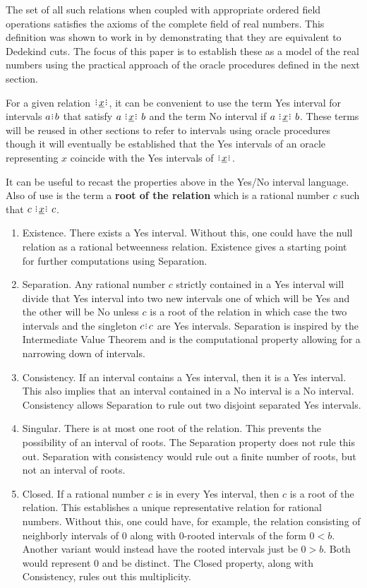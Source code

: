 \documentclass[12pt]{article}
\begin{document}
The set of all such relations when coupled with appropriate ordered field operations satisfies the axioms of the complete field of real numbers. This definition was shown to work in \cite{taylor24dedekind} by demonstrating that they are equivalent to Dedekind cuts. The focus of this paper is to establish these as a model of the real numbers using the practical approach of the oracle procedures defined in the next section. 

For a given relation $\xrel$, it can be convenient to use the term Yes interval for intervals $a\rint b$ that satisfy $a \xrel b$ and the term No interval if \sout{$ a \xrel b$}. These terms will be reused in other sections to refer to intervals using oracle procedures though it will eventually be established that the Yes intervals of an oracle representing $x$ coincide with the Yes intervals of $\xrel$.

It can be useful to recast the properties above in the Yes/No interval language. Also of use is the term a \textbf{root of the relation} which is a rational number $c$ such that $c \xrel c$.

\begin{enumerate}
    \item Existence. There exists a Yes interval. Without this, one could have the null relation as a rational betweenness relation. Existence gives a starting point for further computations using Separation. 
    \item Separation. Any rational number $c$ strictly contained in a Yes interval will divide that Yes interval into two new intervals one of which will be Yes and the other will be No unless $c$ is a root of the relation in which case the two intervals and the singleton $c\rint c$ are Yes intervals. Separation is inspired by the Intermediate Value Theorem and is the computational property allowing for a narrowing down of intervals. 
    \item Consistency. If an interval contains a Yes interval, then it is a Yes interval. This also implies that an interval contained in a No interval is a No interval. Consistency allows Separation to rule out two disjoint separated Yes intervals. 
    \item Singular. There is at most one root of the relation. This prevents the possibility of an interval of roots. The Separation property does not rule this out. Separation with consistency would rule out a finite number of roots, but not an interval of roots.  
    \item Closed. If a rational number $c$ is in every Yes interval, then $c$ is a root of the relation. This establishes a unique representative relation for rational numbers. Without this, one could have, for example, the relation consisting of neighborly intervals of $0$ along with $0$-rooted intervals of the form $0 \lt b$. Another variant would instead have the rooted intervals just be $0 \gt b$. Both would represent $0$ and be distinct. The Closed property, along with Consistency, rules out this multiplicity. 
\end{enumerate}
\end{document}
